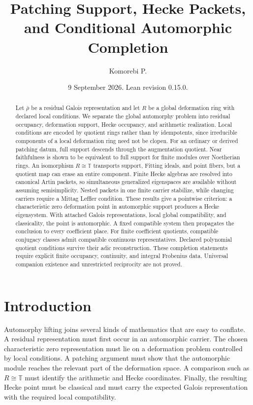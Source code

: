 \documentclass[11pt]{amsart}
\title[Patching support and automorphic completion]{Patching Support, Hecke Packets, and Conditional Automorphic Completion}
\author[Komorebi P.]{Komorebi P.}
\date{9 September 2026. Lean revision 0.15.0.}
\theoremstyle{definition}
\theoremstyle{remark}
\newcommand{\TT}{\mathbb T}
\begin{document}
\begin{abstract}
Let \(\bar\rho\) be a residual Galois representation and let \(R\) be a global deformation ring with declared local conditions. We separate the global automorphy problem into residual occupancy, deformation support, Hecke occupancy, and arithmetic realization. Local conditions are encoded by quotient rings rather than by idempotents, since irreducible components of a local deformation ring need not be clopen. For an ordinary or derived patching datum, full support descends through the augmentation quotient. Near faithfulness is shown to be equivalent to full support for finite modules over Noetherian rings. An isomorphism \(R\cong\TT\) transports support, Fitting ideals, and point fibers, but a quotient map can erase an entire component. Finite Hecke algebras are resolved into canonical Artin packets, so simultaneous generalized eigenspaces are available without assuming semisimplicity. Nested packets in one finite carrier stabilize, while changing carriers require a Mittag Leffler condition. These results give a pointwise criterion: a characteristic zero deformation point in automorphic support produces a Hecke eigensystem. With attached Galois representations, local global compatibility, and classicality, the point is automorphic. A fixed compatible system then propagates the conclusion to every coefficient place. For finite coefficient quotients, compatible conjugacy classes admit compatible continuous representatives. Declared polynomial quotient conditions survive their adic reconstruction. These completion statements require explicit finite occupancy, continuity, and integral Frobenius data. Universal companion existence and unrestricted reciprocity are not proved.
\end{abstract}
\maketitle
\thispagestyle{plain}

\section{Introduction}\label{sec:introduction}

Automorphy lifting joins several kinds of mathematics that are easy to conflate. A residual representation must first occur in an automorphic carrier. The chosen characteristic zero representation must lie on a deformation problem controlled by local conditions. A patching argument must show that the automorphic module reaches the relevant part of the deformation space. A comparison such as \(R\cong\TT\) must identify the arithmetic and Hecke coordinates. Finally, the resulting Hecke point must be classical and must carry the expected Galois representation with the required local compatibility.
\end{document}
